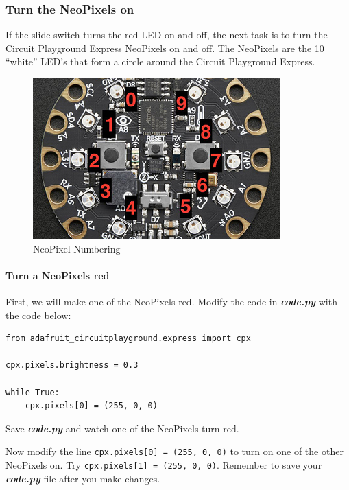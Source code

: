 \documentclass[11pt]{article}
\makeatletter
\def\maxwidth{\ifdim\Gin@nat@width>\linewidth\linewidth
    \else\Gin@nat@width\fi}
\let\Oldincludegraphics\includegraphics
\renewcommand{\includegraphics}[1]{\Oldincludegraphics[width=.8\maxwidth]{#1}}
\makeatother
\begin{document}
    \hypertarget{turn-the-neopixels-on}{%
\subsubsection{Turn the NeoPixels on}\label{turn-the-neopixels-on}}

If the slide switch turns the red LED on and off, the next task is to
turn the Circuit Playground Express NeoPixels on and off. The NeoPixels
are the 10 ``white'' LED's that form a circle around the Circuit
Playground Express.

\begin{figure}
\centering
\includegraphics{images/circuitpython_cpx_neopixel_numbering.jpg}
\caption{NeoPixel Numbering}
\end{figure}

\hypertarget{turn-a-neopixels-red}{%
\paragraph{Turn a NeoPixels red}\label{turn-a-neopixels-red}}

First, we will make one of the NeoPixels red. Modify the code in
\textbf{\emph{code.py}} with the code below:

\begin{verbatim}
from adafruit_circuitplayground.express import cpx

cpx.pixels.brightness = 0.3

while True:
    cpx.pixels[0] = (255, 0, 0)
\end{verbatim}

Save \textbf{\emph{code.py}} and watch one of the NeoPixels turn red.

Now modify the line \texttt{cpx.pixels{[}0{]}\ =\ (255,\ 0,\ 0)} to turn
on one of the other NeoPixels on. Try
\texttt{cpx.pixels{[}1{]}\ =\ (255,\ 0,\ 0)}. Remember to save your
\textbf{\emph{code.py}} file after you make changes.
\end{document}
